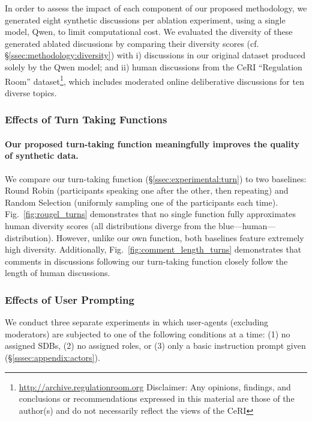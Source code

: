 In order to assess the impact of each component of our proposed methodology, we generated eight synthetic discussions per ablation experiment, using a single model, Qwen, to limit computational cost. We evaluated the diversity of these generated ablated discussions by comparing their diversity scores (cf. \S\ref{ssec:methodology:diversity}) with i) discussions in our original dataset produced solely by the Qwen model; and ii) human discussions from the \ac{CeRI} “Regulation Room” dataset\footnote{\url{http://archive.regulationroom.org} Disclaimer: Any opinions, findings, and conclusions or recommendations expressed in this material are those of the author(s) and do not necessarily reflect the views of the \ac{CeRI}}, which includes moderated online deliberative discussions for ten diverse topics.


\subsubsection{Effects of Turn Taking Functions}

\paragraph{Our proposed turn-taking function meaningfully improves the quality of synthetic data.} We compare our turn-taking function (\S\ref{ssec:experimental:turn}) to two baselines: Round Robin (participants speaking one after the other, then repeating) and Random Selection (uniformly sampling one of the participants each time). Fig.~\ref{fig:rougel_turns} demonstrates that no single function fully approximates human diversity scores (all distributions diverge from the blue—human—distribution). However, unlike our own function, both baselines feature extremely high diversity. Additionally, Fig.~\ref{fig:comment_length_turns} demonstrates that comments in discussions following our turn-taking function closely follow the length of human discussions. %


\subsubsection{Effects of User Prompting}

We conduct three separate experiments in which user-agents (excluding moderators) are subjected to one of the following conditions at a time: (1) no assigned \acp{SDB}, (2) no assigned roles, or (3) only a basic instruction prompt given (\S\ref{sssec:appendix:actors}). 


